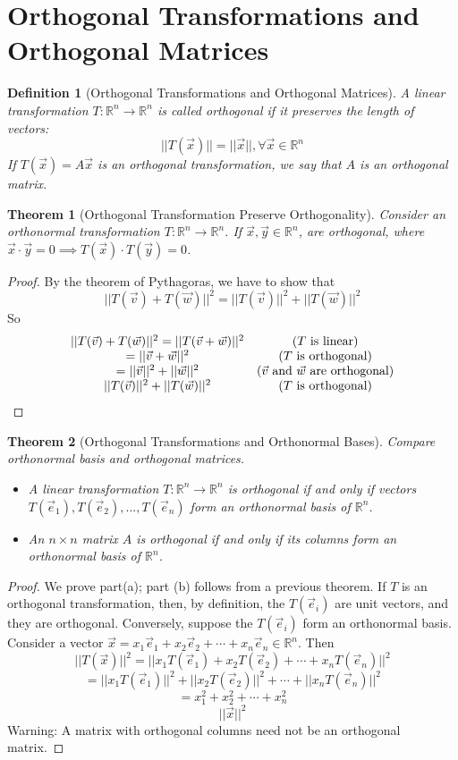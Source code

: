 \documentclass[10pt]{report}
\newtheorem{thm2}{Theorem}[section]
\newtheorem{def2}{Definition}[section]
\begin{document}
\section{Orthogonal Transformations and Orthogonal Matrices}
\begin{def2}[Orthogonal Transformations and Orthogonal Matrices]
A linear transformation $T:\mathbb{R}^n \to \mathbb{R}^n$ is called orthogonal if it preserves the length of vectors:
$$||T(\vec{x})|| = ||\vec{x}||, \forall \vec{x}\in \mathbb{R}^n$$
If $T(\vec{x}) = A\vec{x}$ is an orthogonal transformation, we say that $A$ is an orthogonal matrix.
\end{def2}
\begin{thm2}[Orthogonal Transformation Preserve Orthogonality]
Consider an orthonormal transformation $T:\mathbb{R}^n \to \mathbb{R}^n$. If $\vec{x}, \vec{y}\in \mathbb{R}^n$, are orthogonal, where $\vec{x}\cdot \vec{y}=0 \implies T(\vec{x})\cdot T(\vec{y}) =0$.
\end{thm2}
\begin{proof}
By the theorem of Pythagoras, we have to show that
$$||T(\vec{v})+T(\vec{w})||^2 = ||T(\vec{v})||^2 + ||T(\vec{w})||^2$$
So
$$\begin{array}{c c}
||T(\vec{v})+T(\vec{w})||^2 = ||T(\vec{v}+\vec{w})||^2 & \text{($T$ is linear)}\\
=||\vec{v}+\vec{w}||^2 & \text{($T$ is orthogonal)}\\
=||\vec{v}||^2 + ||\vec{w}||^2 & \text{($\vec{v}$ and $\vec{w}$ are orthogonal)}\\
||T(\vec{v})||^2 + ||T(\vec{w})||^2 & \text{($T$ is orthogonal)}
\end{array}$$
\end{proof}
\begin{thm2}[Orthogonal Transformations and Orthonormal Bases]
Compare orthonormal basis and orthogonal matrices.
\begin{itemize}
\item[a.] A linear transformation $T:\mathbb{R}^n \to \mathbb{R}^n$ is orthogonal if and only if vectors $T(\vec{e}_1), T(\vec{e}_2),..., T(\vec{e}_n)$ form an orthonormal basis of $\mathbb{R}^n$.
\item[b.] An $n\times n$ matrix $A$ is orthogonal if and only if its columns form an orthonormal basis of $\mathbb{R}^n$.
\end{itemize}
\end{thm2}
\begin{proof}
We prove part(a); part (b) follows from a previous theorem. If $T$ is an orthogonal transformation, then, by definition, the $T(\vec{e}_i)$ are unit vectors, and they are orthogonal. Conversely, suppose the $T(\vec{e}_i)$ form an orthonormal basis. Consider a vector $\vec{x}= x_1\vec{e}_1 + x_2\vec{e}_2 + \cdots + x_n\vec{e}_n \in \mathbb{R}^n$. Then
$$||T(\vec{x})||^2 = ||x_1T(\vec{e}_1) + x_2T(\vec{e}_2) + \cdots + x_nT(\vec{e}_n)||^2$$
$$=||x_1T(\vec{e}_1)||^2 + ||x_2T(\vec{e}_2)||^2 + \cdots + ||x_nT(\vec{e}_n)||^2$$
$$=x_1^2 + x_2^2 + \cdots + x_n^2$$
$$||\vec{x}||^2$$
Warning: A matrix with orthogonal columns need not be an orthogonal matrix.
\end{proof}
\end{document}
